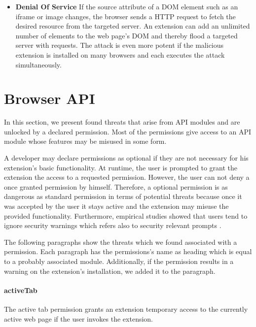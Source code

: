 \begin{itemize}
		\item \textbf{Denial Of Service} If the source attribute of a DOM element such as an iframe or image changes, the browser sends a HTTP request to fetch the desired resource from the targeted server. An extension can add an unlimited number of elements to the web page's DOM and thereby flood a targeted server with requests. The attack is even more potent if the malicious extension is installed on many browsers and each executes the attack simultaneously.
	\end{itemize}
	
\section{Browser API}
\label{sec:threatAnalysis:api}
	
	In this section, we present found threats that arise from API modules and are unlocked by a declared permission. Most of the permissions give access to an API module whose features may be misused in some form. 
	
	A developer may declare permissions as optional if they are not necessary for his extension's basic functionality. At runtime, the user is prompted to grant the extension the access to a requested permission. However, the user can not deny a once granted permission by himself. Therefore, a optional permission is as dangerous as standard permission in terms of potential threats because once it was accepted by the user it stays active and the extension may misuse the provided functionality. Furthermore, empirical studies showed that users tend to ignore security warnings which refers also to security relevant prompts \cite{180371, sunshine2009crying}.
		
	The following paragraphs show the threats which we found associated with a permission. Each paragraph has the permissions's name as heading which is equal to a probably associated module. Additionally, if the permission results in a warning on the extension's installation, we added it to the paragraph.
	
\newenvironment{permissionwarning}{%
	\setlength\topsep{4pt}
	\setlength\parskip{0pt}
	\itshape
\begin{center}
	}{%
\end{center}
}

\paragraph{activeTab}
	The active tab permission grants an extension temporary access to the currently active web page if the user invokes the extension. 
	
